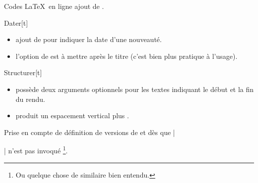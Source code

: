 \begin{doctopic}{Codes \LaTeX\ en ligne}
    ajout de .
\end{doctopic}




\begin{doctopic}{Dater}[t]
    \begin{itemize}
        \item ajout de  pour indiquer la date d'une nouveauté.

        \item l'option de  est à mettre après le titre (c'est bien plus pratique à l'usage).
    \end{itemize}
\end{doctopic}




\begin{doctopic}{Structurer}[t]
    \begin{itemize}
        \item {} possède deux arguments optionnels pour les textes indiquant le début et la fin du rendu.

        \item {} produit un espacement vertical plus .
    \end{itemize}
\end{doctopic}




\begin{doctopic}{Prise en compte de }
    définition de versions  de  et  dès que \docilatex|\usepackage[french]{babel}| n'est pas invoqué
    \footnote{
        Ou quelque chose de similaire bien entendu.
    }.
\end{doctopic}
